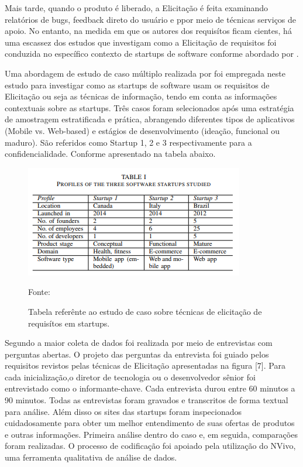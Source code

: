Mais tarde, quando o produto é liberado, a Elicitação é feita
examinando relatórios de bugs, feedback direto do usuário e ppor meio de técnicas serviços de apoio. No entanto, na medida em que os autores dos requisítos ficam cientes, há uma escassez dos estudos que investigam como a Elicitação de requisitos foi conduzida no específico contexto de startups de software conforme abordado por \cite{rafiq2017requirements}.

Uma abordagem de estudo de caso múltiplo realizada por \cite{rafiq2017requirements} foi empregada neste estudo
para investigar como as startups de software usam os requisitos de Elicitação ou seja as técnicas de informação, tendo em conta as informações contextuais sobre as startups. Três casos foram selecionados após uma estratégia de amostragem estratificada e prática, abrangendo diferentes tipos de aplicativos (Mobile vs. Web-based) e estágios de desenvolvimento (ideação, funcional ou maduro). São referidos como Startup 1, 2 e 3 respectivamente para a confidencialidade. Conforme apresentado na tabela abaixo.

\begin{figure}[!htb]
\centering
\label{fig01}
\includegraphics[keepaspectratio=true,scale=0.8]{figuras/tabela_estudo_elicitacao_startups.png}
\caption{Tabela referênte ao estudo de caso sobre técnicas de elicitação de requisítos em startups.}
{Fonte: \cite{rafiq2017requirements}}
\end{figure}

Segundo \cite{rafiq2017requirements} a maior coleta de dados foi realizada por meio de entrevistas com perguntas abertas. O projeto
das perguntas da entrevista foi guiado pelos requisitos revistos pelas
técnicas de Elicitação apresentadas na figura [7]. Para cada inicialização,o diretor de tecnologia ou o desenvolvedor sênior
foi entrevistado como o informante-chave. Cada entrevista durou
entre 60 minutos a 90 minutos. Todas as entrevistas foram
gravados e transcritos de forma textual para análise. Além disso
os sites das startups foram inspecionados cuidadosamente para obter um
melhor entendimento de suas ofertas de produtos e outras informações. Primeira análise dentro do caso e, em seguida, comparações foram realizadas. O processo de codificação foi apoiado pela utilização do
NVivo, uma ferramenta qualitativa de análise de dados.


